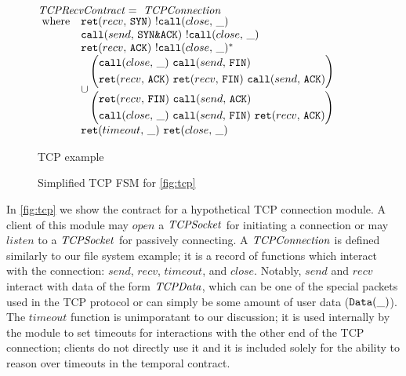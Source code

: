\begin{figure}
 $\tcprecvc =~ \tcpc$ \\
 $\begin{array}{ @{~}r@{\quad} l @{}l @{}l }
  \text{where}
  &&\rcv{\tcpsyn}~ \notclose \\
  &&\send{\tcpsynack}~ \notclose \\
  &&\rcv{\tcpack}~ \stmany{\notclose} \\

  &&\cup
  \begin{aligned}
   &\left(
    \begin{aligned}
     &\call{close}~ \send{\tcpfin} \\
     &\rcv{\tcpack}~ \rcv{\tcpfin}~ \send{\tcpack}
    \end{aligned}
   \right) \\
   &\left(
    \begin{aligned}
     &\rcv{\tcpfin}~ \send{\tcpack} \\
     &\call{close}~ \send{\tcpfin}~ \rcv{\tcpack}
    \end{aligned}
   \right)
  \end{aligned} \\
  &&\ret{timeout}~ \ret{close}
 \end{array}$

 \caption{TCP example}
 \label{fig:tcp}
\end{figure}

\begin{figure}
 \centering
 \fontsize{4}{5} \selectfont
 \def \svgwidth{\columnwidth}
 
 \caption{Simplified TCP FSM for \autoref{fig:tcp}}
 \label{fig:tcp-fsm}
\end{figure}

In \autoref{fig:tcp} we show the contract for a hypothetical TCP connection module.
%
A client of this module may $open$ a $\mathit{TCPSocket}$ for initiating a connection or may $listen$ to a $\mathit{TCPSocket}$ for passively connecting.
%
A $\mathit{TCPConnection}$ is defined similarly to our file system example; it is a record of functions which interact with the connection: $send$, $recv$, $timeout$, and $close$.
%
Notably, $send$ and $recv$ interact with data of the form $\mathit{TCPData}$, which can be one of the special packets used in the TCP protocol or can simply be some amount of user data ($\texttt{Data}(\_)$).
%
The $timeout$ function is unimporatant to our discussion; it is used internally by the module to set timeouts for interactions with the other end of the TCP connection; clients do not directly use it and it is included solely for the ability to reason over timeouts in the temporal contract.

